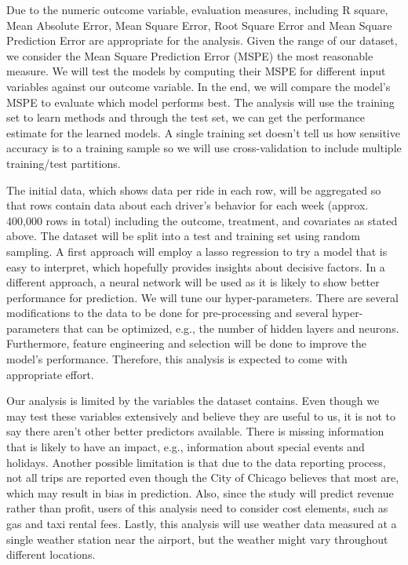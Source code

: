 \documentclass[twoside,11pt]{article}
\begin{document}
Due to the numeric outcome variable, evaluation measures, including R square, Mean Absolute Error, Mean Square Error, Root Square Error and Mean Square Prediction Error are appropriate for the analysis. Given the range of our dataset, we consider the Mean Square Prediction Error (MSPE) the most reasonable measure. We will test the models by computing their MSPE for different input variables against our outcome variable.  In the end, we will compare the model's MSPE to evaluate which model performs best. The analysis will use the training set to learn methods and through the test set, we can get the performance estimate for the learned models. A single training set doesn't tell us how sensitive accuracy is to a training sample so we will use cross-validation to include multiple training/test partitions.\par

The initial data, which shows data per ride in each row, will be aggregated so that rows contain data about each driver's behavior for each week (approx. 400,000 rows in total) including the outcome, treatment, and covariates as stated above. The dataset will be split into a test and training set using random sampling.
A first approach will employ a lasso regression to try a model that is easy to interpret, which hopefully provides insights about decisive factors. In a different approach, a neural network will be used as it is likely to show better performance for prediction. We will tune our hyper-parameters.
There are several modifications to the data to be done for pre-processing and several hyper-parameters that can be optimized, e.g., the number of hidden layers and neurons. Furthermore, feature engineering and selection will be done to improve the model's performance. Therefore, this analysis is expected to come with appropriate effort. \par

Our analysis is limited by the variables the dataset contains. Even though we may test these variables extensively and believe they are useful to us, it is not to say there aren't other better predictors available. There is missing information that is likely to have an impact, e.g., information about special events and holidays. Another possible limitation is that due to the data reporting process, not all trips are reported even though the City of Chicago believes that most are, which may result in bias in prediction. Also, since the study will predict revenue rather than profit, users of this analysis need to consider cost elements, such as gas and taxi rental fees. Lastly, this analysis will use weather data measured at a single weather station near the airport, but the weather might vary throughout different locations.\par
\end{document}
